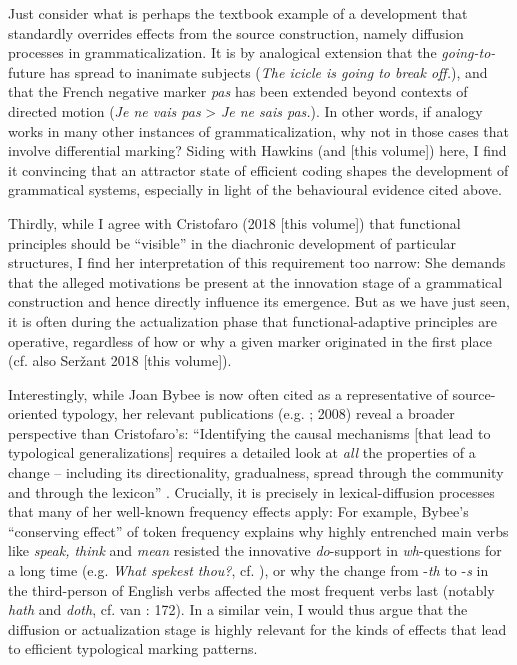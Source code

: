 \documentclass[output=paper]{langsci/langscibook}
\begin{document}
Just consider what is perhaps the textbook example of a development that standardly overrides effects from the source construction, namely diffusion processes in grammaticalization. It is by analogical extension that the \textit{going-to-}future has spread to inanimate subjects (\textit{The icicle is going to break off.}), and that the French negative marker \textit{pas} has been extended beyond contexts of directed motion (\textit{Je ne vais pas} > \textit{Je ne sais pas.}). In other words, if analogy works in many other instances of grammaticalization, why not in those cases that involve differential marking? Siding with Hawkins (and \citealt{Haspelmath2018} [this volume]) here, I find it convincing that an attractor state of efficient coding shapes the development of grammatical systems, especially in light of the behavioural evidence cited above.

Thirdly, while I agree with Cristofaro (2018 [this volume]) that functional principles should be “visible” in the diachronic development of particular structures, I find her interpretation of this requirement too narrow: She demands that the alleged motivations be present at the innovation stage of a grammatical construction and hence directly influence its emergence. But as we have just seen, it is often during the actualization phase that functional-adaptive principles are operative, regardless of how or why a given marker originated in the first place (cf. also Seržant 2018 [this volume]). 

Interestingly, while Joan Bybee is now often cited as a representative of source-oriented typology, her relevant publications (e.g. \citealt{Bybee1988}; 2008) reveal a broader perspective than Cristofaro’s: “Identifying the causal mechanisms [that lead to typological generalizations] requires a detailed look at \textit{all} the properties of a change – including its directionality, gradualness, spread through the community and through the lexicon” \citep[108]{Bybee2008}. Crucially, it is precisely in lexical-diffusion processes that many of her well-known frequency effects apply: For example, Bybee’s “conserving effect” of token frequency explains why highly entrenched main verbs like \textit{speak, think} and \textit{mean} resisted the innovative \textit{do}{}-support in \textit{wh}{}-questions for a long time (e.g. \textit{What spekest thou?}, cf. \citealt{Ogura1993}), or why the change from -\textit{th} to -\textit{s} in the third-person of English verbs affected the most frequent verbs last (notably \textit{hath} and \textit{doth}, cf. van \citealt{Gelderen2014}: 172). In a similar vein, I would thus argue that the diffusion or actualization stage is highly relevant for the kinds of effects that lead to efficient typological marking patterns. 
\end{document}
